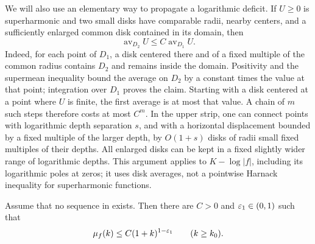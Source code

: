 We will also use an elementary way to propagate a logarithmic
deficit. If \(U\ge0\) is superharmonic and two small disks have
comparable radii, nearby centers, and a sufficiently enlarged common
disk contained in its domain, then
\begin{equation}\label{critical:eq:deficit-step}
 \operatorname{av}_{D_2}U\le C\operatorname{av}_{D_1}U.
\end{equation}
Indeed, for each point of \(D_1\), a disk centered there and of a
fixed multiple of the common radius contains \(D_2\) and remains
inside the domain. Positivity and the supermean inequality bound the
average on \(D_2\) by a constant times the value at that point;
integration over \(D_1\) proves the claim. Starting with a disk
centered at a point where \(U\) is finite, the first average is at
most that value. A chain of \(m\) such steps therefore costs at most
\(C^m\). In the upper strip, one can connect points with logarithmic
depth separation \(s\), and with a horizontal displacement bounded
by a fixed multiple of the larger depth, by \(O(1+s)\) disks of
radii small fixed multiples of their depths. All enlarged disks can
be kept in a fixed slightly wider range of logarithmic depths.
This argument applies to \(K-\log|f|\), including its logarithmic
poles at zeros; it uses disk averages, not a pointwise Harnack
inequality for superharmonic functions.

\begin{proposition}\label{critical:prop:power-saving}
Assume that no sequence in  exists.
Then there are \(C>0\) and \(\varepsilon_1\in(0,1)\) such that
\begin{equation}\label{critical:eq:mu-f-saving}
 \mu_f(k)\le C(1+k)^{1-\varepsilon_1}\qquad(k\ge k_0).
\end{equation}
\end{proposition}

